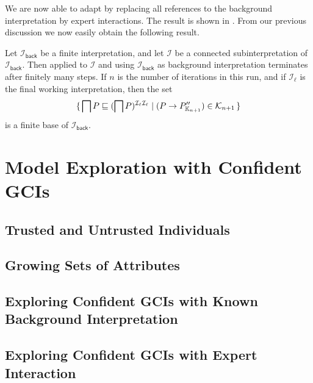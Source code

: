 We are now able to adapt  by replacing all references to
the background interpretation by expert interactions.  The result is shown in
.  From our previous discussion we now easily obtain the
following result.

\begin{Theorem}
  \label{thm:Felix-6.16}
  Let $\mathcal{I}_{\mathsf{back}}$ be a finite interpretation, and let $\mathcal{I}$ be a
  connected subinterpretation of $\mathcal{I}_{\mathsf{back}}$.  Then
   applied to $\mathcal{I}$ and using
  $\mathcal{I}_{\mathsf{back}}$ as background interpretation terminates after finitely
  many steps.  If $n$ is the number of iterations in this run, and if $\mathcal{I}_{\ell}$
  is the final working interpretation, then the set
  \begin{equation*}
    {\ensuremath{\{\, \bigsqcap P \sqsubseteq (\bigsqcap P)^{\mathcal{I}_{\ell}\mathcal{I}_{\ell}}
      \mid (P \to P_{{\mathbb{K}}_{n+1}}'') \in \mathcal{K}_{n+1} \,\}}}
  \end{equation*}
  is a finite base of $\mathcal{I}_{\mathsf{back}}$.
\end{Theorem}

\section{Model Exploration with Confident GCIs}
\label{sec:model-expl-with-1}

%

\subsection{Trusted and Untrusted Individuals}
\label{sec:trust-untr-indiv}

\subsection{Growing Sets of Attributes}
\label{sec:grow-sets-attr-1}

\subsection{Exploring Confident GCIs with Known Background Interpretation}
\label{sec:expl-conf-gcis}

\subsection{Exploring Confident GCIs with Expert Interaction}
\label{sec:expl-conf-gcis-1}


